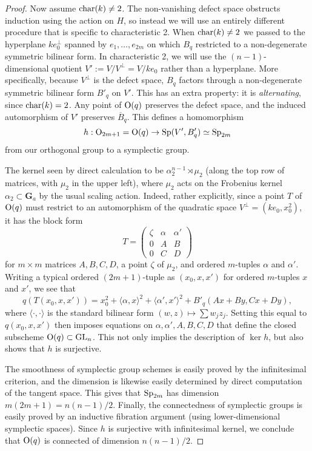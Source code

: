 \documentclass[10pt]{article}
\newcommand{\GL}{\operatorname{GL}}
\renewcommand{\(}{\left(}
\renewcommand{\)}{\right)}
\numberwithin{thm}{subsection}
\begin{document}
\begin{proof}
Now assume ${\rm{char}}(k) \ne 2$.  The non-vanishing defect space
obstructs induction using the action on $H$, so instead we will use an entirely
different procedure that is specific to characteristic 2.   
When ${\rm{char}}(k) \ne 2$ we passed
to the hyperplane $k e_0^{\perp}$ spanned
by $e_1,\dots,e_{2m}$ on which $B_q$ restricted
to a non-degenerate symmetric bilinear form.
In characteristic 2, we will use the $(n-1)$-dimensional
quotient $V' := V/V^{\perp} = V/ke_0$ rather than a
hyperplane.  More specifically, because $V^{\perp}$ is the defect space, $B_q$ factors through 
a non-degenerate symmetric bilinear form $B'_q$ on $V'$. 
This has an extra property: it is {\em alternating}, since ${\rm{char}}(k) = 2$.
Any point of ${\rm{O}}(q)$ preserves the defect space, 
and the induced automorphism of $V'$ preserves
$\overline{B}_q$.  This defines a homomorphism
$$h:{\rm{O}}_{2m+1} = {\rm{O}}(q) \rightarrow {\rm{Sp}}(V',B'_q) \simeq {\rm{Sp}}_{2m}$$
from our orthogonal group to a symplectic group. 

The kernel seen by direct calculation to be $\alpha_2^{n-1} \rtimes \mu_2$
(along the top row of matrices, with $\mu_2$ in the upper left), where $\mu_2$ acts on
the Frobenius kernel $\alpha_2 \subset \mathbf{G}_a$ by the usual scaling action.
Indeed, rather explicitly, since a point $T$ of ${\rm{O}}(q)$ must 
restrict to an automorphism of the quadratic space $V^{\perp} = (ke_0, x_0^2)$, 
it has the block form
$$T = \begin{pmatrix} \zeta & \alpha & \alpha' \\ 0 & A & B \\ 0 & C & D \end{pmatrix}$$
for $m \times m$ matrices $A, B, C, D$, a point
$\zeta$ of $\mu_2$, and ordered $m$-tuples $\alpha$ and $\alpha'$.
Writing a typical ordered $(2m+1)$-tuple as $(x_0, x, x')$ for ordered
$m$-tuples $x$ and $x'$, we see that
$$q(T(x_0, x, x')) =  x_0^2 + \langle \alpha, x \rangle^2 + \langle \alpha', x' \rangle^2 +
B'_q(Ax + By, Cx + Dy),$$
where $\langle \cdot, \cdot \rangle$ is the standard bilinear form
$(w,z) \mapsto \sum w_j z_j$.  Setting this equal to $q(x_0,x,x')$
then imposes equations on $\alpha, \alpha', A,B,C,D$ that define
the closed subscheme ${\rm{O}}(q) \subset \GL_n$.  This not only implies
the description of $\ker h$, but also shows that $h$ is surjective.

The smoothness of symplectic group schemes is easily proved
by the infinitesimal criterion, and the dimension is likewise
easily determined by direct computation of the tangent space.
This gives that ${\rm{Sp}}_{2m}$ has dimension
$m(2m+1) = n(n-1)/2$.  Finally, the connectedness of symplectic 
groups is easily proved by an inductive fibration argument
(using lower-dimensional symplectic spaces).
Since $h$ is surjective with infinitesimal kernel,
we conclude that ${\rm{O}}(q)$ is connected of dimension $n(n-1)/2$.


\end{proof}
\end{document}
